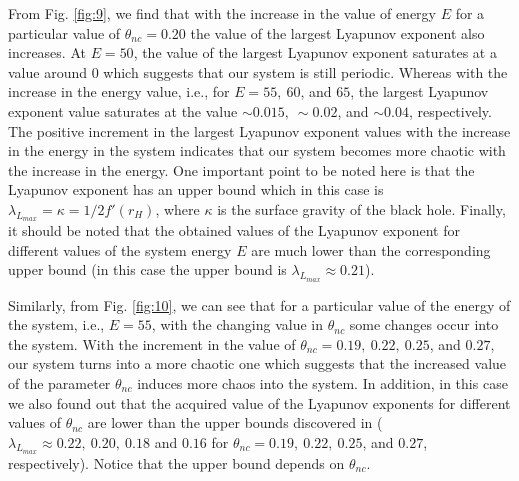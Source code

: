\documentclass[aps,prd,showpacs,nofootinbib,floats,floatfix,preprintnumbers,groupedaddress,twocolumn]{revtex4-1}
\begin{document}
From Fig. \ref{fig:9}, we find that with the increase in the value of  energy $E$ for a particular value of $\theta_{nc}=0.20$ the value of the largest Lyapunov exponent also increases. At $E=50$, the value of the largest Lyapunov exponent saturates at a value around $0$ which suggests that our system is still periodic. Whereas with the increase in the energy value, i.e., for $E=55,~60$, and $65$, the largest Lyapunov exponent value saturates at the value $\sim 0.015,~\sim 0.02$, and $\sim 0.04$, respectively. The positive increment in the largest Lyapunov exponent values with the increase in the energy in the system indicates that our system becomes more chaotic with the increase in  the energy. One important point to be noted here is that the Lyapunov exponent has an upper bound \cite{Maldacena:2015waa} which in this case is $\lambda_{L_{max}}=\kappa=1/2f'(r_{H})$, where $\kappa$ is the surface gravity of the black hole. Finally, it should be noted that the obtained values of the Lyapunov exponent for different values of the system energy $E$ are much lower than the corresponding upper bound (in this case the upper bound is $\lambda_{L_{max}}\approx 0.21$).   

Similarly, from Fig. \ref{fig:10}, we can see that for a particular value of the energy of the system, i.e., $E=55$, with the changing value in $\theta_{nc}$ some changes occur into the system. With the increment in the value of $\theta_{nc}=0.19,~0.22,~0.25$, and $0.27$, our system turns into a more chaotic one which suggests that the increased value of the parameter $\theta_{nc}$ induces more chaos into the system. In addition, in this case we also found out that the acquired value of the Lyapunov exponents for different values of $\theta_{nc}$ are lower than the upper bounds discovered in \cite{Maldacena:2015waa} ($\lambda_{L_{max}}\approx 0.22,~0.20,~0.18$ and $0.16$ for $\theta_{nc}=0.19,~0.22,~0.25$, and $0.27$, respectively). Notice that the upper bound depends on $\theta_{nc}$.
%
%
%
%
\end{document}
